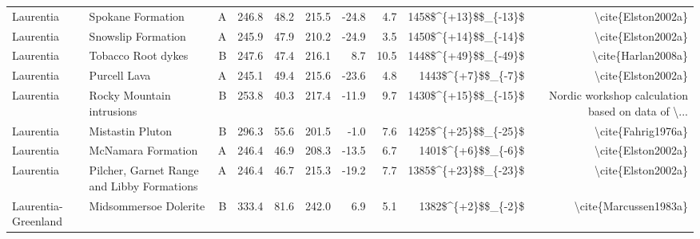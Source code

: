 \begin{longtable}{p{1 in}p{1 in}rrrrrrrr}
                     Laurentia &                                Spokane Formation &      A &     246.8 &      48.2 & 215.5 & -24.8 &       4.7 &   1458\$\textasciicircum \{+13\}\$\$\_\{-13\}\$ &                                 \textbackslash cite\{Elston2002a\} \\
                     Laurentia &                               Snowslip Formation &      A &     245.9 &      47.9 & 210.2 & -24.9 &       3.5 &   1450\$\textasciicircum \{+14\}\$\$\_\{-14\}\$ &                                 \textbackslash cite\{Elston2002a\} \\
                     Laurentia &                               Tobacco Root dykes &      B &     247.6 &      47.4 & 216.1 &   8.7 &      10.5 &   1448\$\textasciicircum \{+49\}\$\$\_\{-49\}\$ &                                 \textbackslash cite\{Harlan2008a\} \\
                     Laurentia &                                     Purcell Lava &      A &     245.1 &      49.4 & 215.6 & -23.6 &       4.8 &     1443\$\textasciicircum \{+7\}\$\$\_\{-7\}\$ &                                 \textbackslash cite\{Elston2002a\} \\
                     Laurentia &                        Rocky Mountain intrusions &      B &     253.8 &      40.3 & 217.4 & -11.9 &       9.7 &   1430\$\textasciicircum \{+15\}\$\$\_\{-15\}\$ &  Nordic workshop calculation based on data of \textbackslash ... \\
                     Laurentia &                                 Mistastin Pluton &      B &     296.3 &      55.6 & 201.5 &  -1.0 &       7.6 &   1425\$\textasciicircum \{+25\}\$\$\_\{-25\}\$ &                                 \textbackslash cite\{Fahrig1976a\} \\
                     Laurentia &                               McNamara Formation &      A &     246.4 &      46.9 & 208.3 & -13.5 &       6.7 &     1401\$\textasciicircum \{+6\}\$\$\_\{-6\}\$ &                                 \textbackslash cite\{Elston2002a\} \\
                     Laurentia &       Pilcher, Garnet Range and Libby Formations &      A &     246.4 &      46.7 & 215.3 & -19.2 &       7.7 &   1385\$\textasciicircum \{+23\}\$\$\_\{-23\}\$ &                                 \textbackslash cite\{Elston2002a\} \\
           Laurentia-Greenland &                            Midsommersoe Dolerite &      B &     333.4 &      81.6 & 242.0 &   6.9 &       5.1 &     1382\$\textasciicircum \{+2\}\$\$\_\{-2\}\$ &                              \textbackslash cite\{Marcussen1983a\} \\

\end{longtable}
